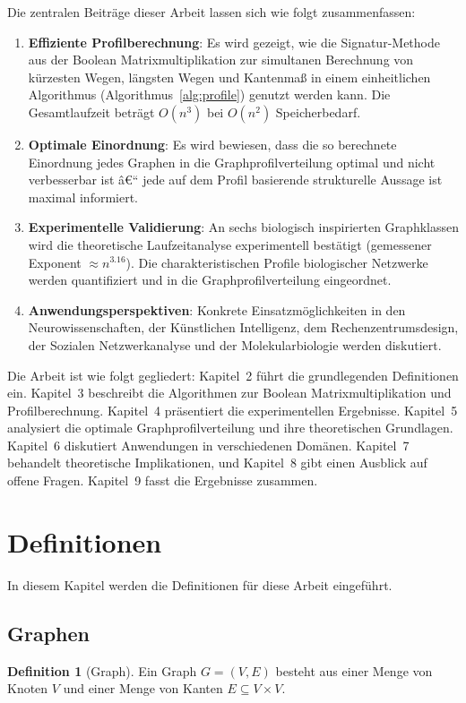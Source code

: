﻿\documentclass[a4paper,12pt]{article}
\theoremstyle{definition}
\newtheorem{definition}{Definition}
\begin{document}
	Die zentralen Beiträge dieser Arbeit lassen sich wie folgt zusammenfassen:

	\begin{enumerate}
		\item \textbf{Effiziente Profilberechnung}: Es wird gezeigt, wie die Signatur-Methode aus der Boolean Matrixmultiplikation zur simultanen Berechnung von kürzesten Wegen, längsten Wegen und Kantenmaß in einem einheitlichen Algorithmus (Algorithmus~\ref{alg:profile}) genutzt werden kann. Die Gesamtlaufzeit beträgt $O(n^3)$ bei $O(n^2)$ Speicherbedarf.
		\item \textbf{Optimale Einordnung}: Es wird bewiesen, dass die so berechnete Einordnung jedes Graphen in die Graphprofilverteilung optimal und nicht verbesserbar ist â€“ jede auf dem Profil basierende strukturelle Aussage ist maximal informiert.
		\item \textbf{Experimentelle Validierung}: An sechs biologisch inspirierten Graphklassen wird die theoretische Laufzeitanalyse experimentell bestätigt (gemessener Exponent $\approx n^{3.16}$). Die charakteristischen Profile biologischer Netzwerke werden quantifiziert und in die Graphprofilverteilung eingeordnet.
		\item \textbf{Anwendungsperspektiven}: Konkrete Einsatzmöglichkeiten in den Neurowissenschaften, der Künstlichen Intelligenz, dem Rechenzentrumsdesign, der Sozialen Netzwerkanalyse und der Molekularbiologie werden diskutiert.
	\end{enumerate}

	\bigskip
	\noindent
	Die Arbeit ist wie folgt gegliedert: Kapitel~2 führt die grundlegenden Definitionen ein. Kapitel~3 beschreibt die Algorithmen zur Boolean Matrixmultiplikation und Profilberechnung. Kapitel~4 präsentiert die experimentellen Ergebnisse. Kapitel~5 analysiert die optimale Graphprofilverteilung und ihre theoretischen Grundlagen. Kapitel~6 diskutiert Anwendungen in verschiedenen Domänen. Kapitel~7 behandelt theoretische Implikationen, und Kapitel~8 gibt einen Ausblick auf offene Fragen. Kapitel~9 fasst die Ergebnisse zusammen.

	\section{Definitionen}
	In diesem Kapitel werden die Definitionen für diese Arbeit eingeführt.
	\subsection{Graphen}
	\begin{definition}[Graph]
		Ein Graph $G = (V, E)$ besteht aus einer Menge von Knoten $V$ und einer Menge von Kanten $E \subseteq V \times V$.
	\end{definition}
	
\end{document}
